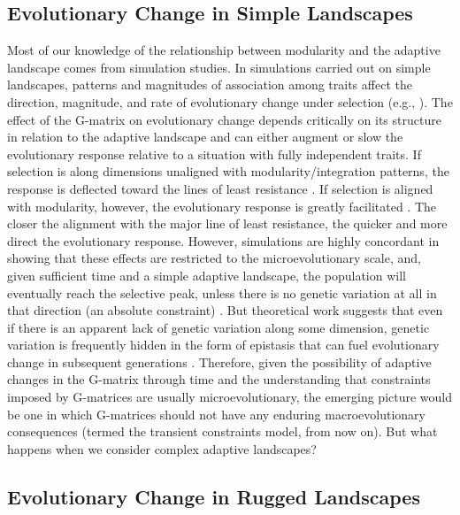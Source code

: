 \begin{refsection}
\subsection{Evolutionary Change in Simple Landscapes}

Most of our knowledge of the relationship between modularity and the
adaptive landscape comes from simulation studies. In simulations carried
out on simple landscapes, patterns and magnitudes of association among
traits affect the direction, magnitude, and rate of evolutionary change
under selection (e.g., \textcite{Marroig2010-be}). The effect of the G-matrix on evolutionary change
depends critically on its structure in relation to the adaptive
landscape \parencite{Conner2012-ru, Laughlin2015-od} and can
either augment or slow the evolutionary response relative to a situation
with fully independent traits. If selection is along dimensions
unaligned with modularity/integration patterns, the response is
deflected toward the lines of least resistance \parencite{Schluter1996-gw}. If selection is
aligned with modularity, however, the evolutionary response is greatly
facilitated \parencite{Beldade2002-vf, Bolstad2014-oi}. The closer the
alignment with the major line of least resistance, the quicker and more
direct the evolutionary response. However, simulations are highly
concordant in showing that these effects are restricted to the
microevolutionary scale, and, given sufficient time and a simple
adaptive landscape, the population will eventually reach the selective
peak, unless there is no genetic variation at all in that direction (an
absolute constraint) \parencite{Blows2005-sd}. But theoretical work suggests that even if there is an apparent
lack of genetic variation along some dimension, genetic variation is
frequently hidden in the form of epistasis that can fuel evolutionary
change in subsequent generations \parencite{Hansen2013-vy, Hansen2006-yc}.
Therefore, given the possibility of adaptive changes in the G-matrix
through time and the understanding that constraints imposed by
G-matrices are usually microevolutionary, the emerging picture would be
one in which G-matrices should not have any enduring macroevolutionary
consequences (termed the transient constraints model, from now on). But
what happens when we consider complex adaptive landscapes?

\subsection{Evolutionary Change in Rugged Landscapes}


\end{refsection}
